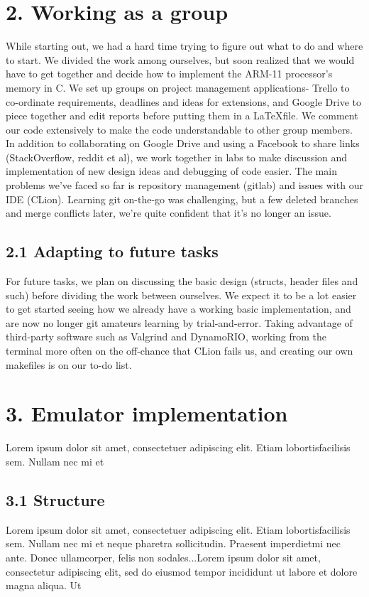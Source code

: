 \documentclass[a4paper, twoside]{report}
\begin{document}
\section*{2. Working as a group}
While starting out, we had a hard time trying to figure out what to do and where to start. We divided the work among ourselves, but soon realized that we would have to get together and decide how to implement the ARM-11 processor's memory in C. 
We set up groups on project management applications- Trello to co-ordinate requirements, deadlines and ideas for extensions, and Google Drive to piece together and edit reports before putting them in a \LaTeX file. We comment our code extensively to make the code understandable to other group members. In addition to collaborating on Google Drive and using a Facebook to share links (StackOverflow, reddit et al), we work together in labs to make discussion and implementation of new design ideas and debugging of code easier. 
The main problems we've faced so far is repository management (gitlab) and issues with our IDE (CLion). Learning git on-the-go was challenging, but a few deleted branches and merge conflicts later, we're quite confident that it's no longer an issue.

\subsection*{2.1 Adapting to future tasks}

For future tasks, we plan on discussing the basic design (structs, header files and such) before dividing the work between ourselves. We expect it to be a lot easier to get started seeing how we already have a working basic implementation, and are now no longer git amateurs learning by trial-and-error. Taking advantage of third-party software such as Valgrind and DynamoRIO, working from the terminal more often on the off-chance that CLion fails us, and creating our own makefiles is on our to-do list. 
\section*{}

\section*{3. Emulator implementation}
Lorem  ipsum  dolor  sit  amet,  consectetuer  adipiscing  
elit.   Etiam  lobortisfacilisis sem.  Nullam nec mi et 
\subsection*{3.1 Structure}
Lorem  ipsum  dolor  sit  amet,  consectetuer  adipiscing  
elit.   Etiam  lobortisfacilisis sem.  Nullam nec mi et 
neque pharetra sollicitudin.  Praesent imperdietmi nec ante. 
Donec ullamcorper, felis non sodales...Lorem ipsum dolor sit amet, consectetur adipiscing elit, sed do 
eiusmod tempor incididunt ut labore et dolore magna aliqua. Ut 
\end{document}
